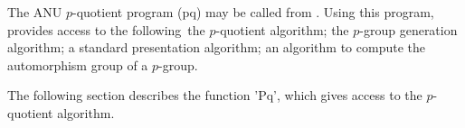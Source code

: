 
The ANU $p$-quotient program (pq) may  be called from {\GAP}.  Using this
program,  {\GAP}  provides access to   the  following\:\ the $p$-quotient
algorithm;  the $p$-group  generation algorithm; a  standard presentation
algorithm; an algorithm to compute the automorphism group of a $p$-group.

The  following section describes the function 'Pq', which gives access to
the $p$-quotient algorithm.

